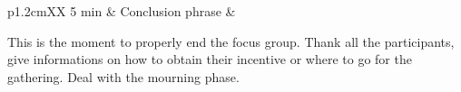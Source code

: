 \begin{longtable}{p{1.2cm}XX}
5 min & Conclusion phrase &
\begin{minipage}[t]{\linewidth}%
This is the moment to properly end the focus group. Thank all the participants, give informations on how to obtain their incentive or where to go for the gathering. Deal with the mourning phase.
\end{minipage}\\

\noalign{\smallskip}

\caption{Proposed themes and questions for a focus group on Regorus}
\label{proposedRoadmap}
\end{longtable}

